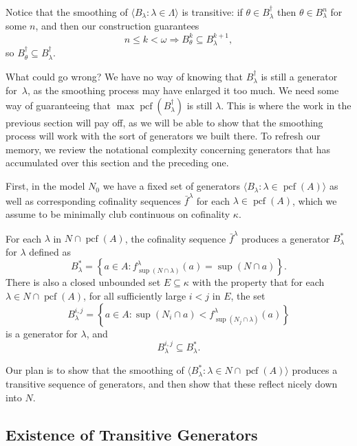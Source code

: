 \documentclass[10pt]{amsart}
\theoremstyle{plain}
\theoremstyle{definition}
\theoremstyle{remark}
\DeclareMathOperator{\pcf}{pcf}
\numberwithin{equation}{section}
\begin{document}
Notice that the smoothing of $\langle B_\lambda:\lambda\in\Lambda\rangle$ is transitive:  if $\theta\in B^\dagger_\lambda$ then
$\theta\in B^n_\lambda$ for some $n$, and then our construction guarantees
\begin{equation}
n\leq k<\omega\Longrightarrow B^k_\theta\subseteq B^{k+1}_\lambda,
\end{equation}
so $B^\dagger_\theta\subseteq B^\dagger_\lambda$.

What could go wrong?  We have no way of knowing that $B^\dagger_\lambda$ is still a generator for~$\lambda$, as the smoothing
process may have enlarged it too much.  We need some way of guaranteeing that $\max\pcf(B^\dagger_\lambda)$ is still $\lambda$.
This is where the work in the previous section will pay off, as we will be able to show that the smoothing process will work with
the sort of generators we built there.  To refresh our memory,  we review the notational complexity concerning generators that
has accumulated over this section and the preceding one.

First, in the model $N_0$ we have a fixed set of generators $\langle B_\lambda:\lambda\in\pcf(A)\rangle$ as well as corresponding
cofinality sequences $\bar{f}^\lambda$ for each $\lambda\in\pcf(A)$, which we assume to be minimally club continuous on
cofinality $\kappa$.

For each $\lambda$ in $N\cap\pcf(A)$, the cofinality sequence $\bar{f}^\lambda$ produces a generator $B^*_\lambda$ for $\lambda$
defined as
\begin{equation}
B^*_\lambda = \left\{a\in A: f^\lambda_{\sup(N\cap\lambda)}(a)=\sup(N\cap a)\right\}.
\end{equation}
There is also a closed unbounded set $E\subseteq\kappa$ with the property that for each $\lambda\in N\cap\pcf(A)$, for all
sufficiently large $i<j$ in $E$, the set
\begin{equation}
\label{eqn:7.5}
B^{i, j}_\lambda = \left\{a\in A: \sup(N_i\cap a)<f^\lambda_{\sup(N_j\cap\lambda)}(a)\right\}
\end{equation}
is a generator for $\lambda$, and
\begin{equation}
B^{i, j}_\lambda\subseteq B^*_\lambda.
\end{equation}

Our plan is to show that the smoothing of $\langle B^*_\lambda:\lambda\in N\cap\pcf(A)\rangle$ produces a transitive sequence of
generators, and then show that these reflect nicely down into $N$.


\subsection{Existence of Transitive Generators}
\end{document}

